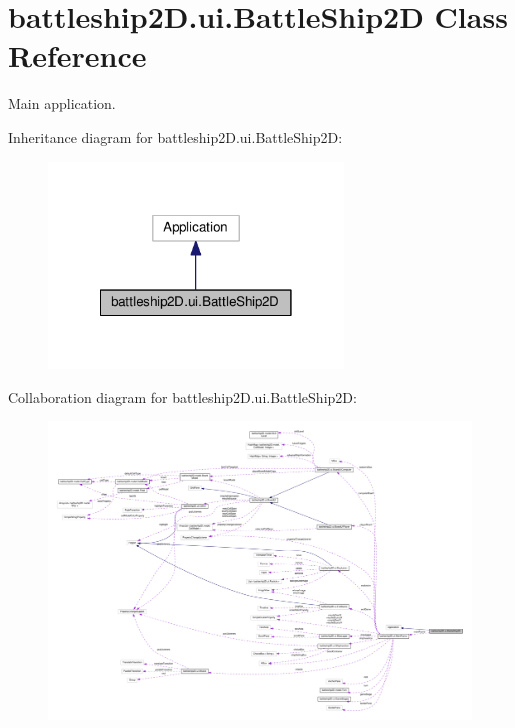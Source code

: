\hypertarget{classbattleship2D_1_1ui_1_1BattleShip2D}{\section{battleship2\-D.\-ui.\-Battle\-Ship2\-D Class Reference}
\label{classbattleship2D_1_1ui_1_1BattleShip2D}
}


Main application.  




Inheritance diagram for battleship2\-D.\-ui.\-Battle\-Ship2\-D\-:\nopagebreak
\begin{figure}[H]
\begin{center}
\leavevmode
\includegraphics[width=222pt]{classbattleship2D_1_1ui_1_1BattleShip2D__inherit__graph}
\end{center}
\end{figure}


Collaboration diagram for battleship2\-D.\-ui.\-Battle\-Ship2\-D\-:\nopagebreak
\begin{figure}[H]
\begin{center}
\leavevmode
\includegraphics[width=350pt]{classbattleship2D_1_1ui_1_1BattleShip2D__coll__graph}
\end{center}
\end{figure}
